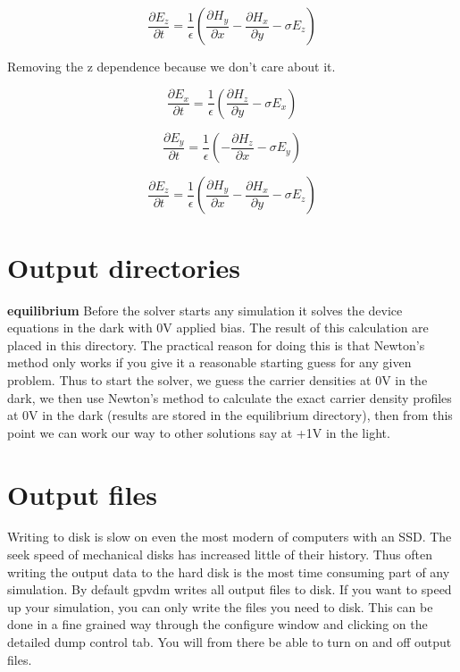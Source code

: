 \documentclass[11pt]{article}
\begin{document}
\begin{equation}
\frac{\partial E_z}{\partial t}= \frac{1}{\epsilon}(\frac{\partial H_y}{\partial x}-\frac{\partial H_x}{\partial y}-\sigma E_z) 
\end{equation}

Removing the z dependence because we don't care about it.

\begin{equation}
\frac{\partial E_x}{\partial t}= \frac{1}{\epsilon}(\frac{\partial H_z}{\partial y}-\sigma E_x) 
\end{equation}

\begin{equation}
\frac{\partial E_y}{\partial t}= \frac{1}{\epsilon}(-\frac{\partial H_z}{\partial x}-\sigma E_y) 
\end{equation}

\begin{equation}
\frac{\partial E_z}{\partial t}= \frac{1}{\epsilon}(\frac{\partial H_y}{\partial x}-\frac{\partial H_x}{\partial y}-\sigma E_z) 
\end{equation}




\appendix
{}
\section{Output directories}
\textbf{equilibrium}\newline
Before the solver starts any simulation it solves the device equations in the dark with 0V applied bias.  The result of this calculation are placed in this directory.  The practical reason for doing this is that Newton's method only works if you give it a reasonable starting guess for any given problem.  Thus to start the solver, we guess the carrier densities at 0V in the dark, we then use Newton's method to calculate the exact carrier density profiles at 0V in the dark (results are stored in the equilibrium directory), then from this point we can work our way to other solutions say at +1V in the light.\cite{0953-8984-25-21-215301}
\newline

\section{Output files}
Writing to disk is slow on even the most modern of computers with an SSD.  The seek speed of mechanical disks has increased little of their history.  Thus often writing the output data to the hard disk is the most time consuming part of any simulation.  By default gpvdm writes all output files to disk.  If you want to speed up your simulation, you can only write the files you need to disk.  This can be done in a fine grained way through the configure window and clicking on the detailed dump control tab.  You will from there be able to turn on and off output files.
\end{document}

